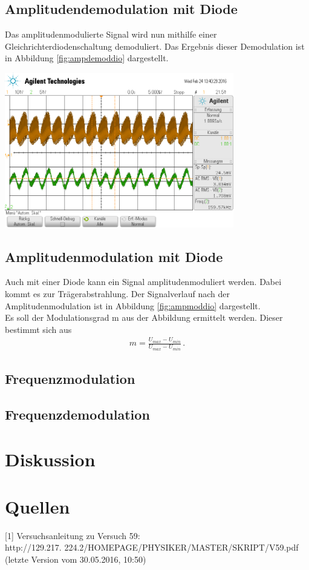 \documentclass[]{scrartcl}
\begin{document}
\subsection{Amplitudendemodulation mit Diode}
Das amplitudenmodulierte Signal wird nun mithilfe einer Gleichrichterdiodenschaltung demoduliert. Das Ergebnis dieser Demodulation ist in Abbildung \ref{fig:ampdemoddio} dargestellt. 
\begin{center}
	\includegraphics[width=10cm]{images/ampdemoddio.png}
	\label{fig:ampdemoddio}
\end{center}
\subsection{Amplitudenmodulation mit Diode}
Auch mit einer Diode kann ein Signal amplitudenmoduliert werden. Dabei kommt es zur Trägerabstrahlung. Der Signalverlauf nach der Amplitudenmodulation ist in Abbildung \ref{fig:ampmoddio} dargestellt. \\
Es soll der Modulationsgrad m aus der Abbildung ermittelt werden. Dieser bestimmt sich aus
\begin{align}
m=\frac{U_{max}-U_{min}}{U_{max}-U_{min}}\,.
\label{eq:modgrad}
\end{align}

\subsection{Frequenzmodulation}

\subsection{Frequenzdemodulation}

\section{Diskussion}

\section{Quellen}
{[1]} Versuchsanleitung zu Versuch 59: \\
http://129.217.
224.2/HOMEPAGE/PHYSIKER/MASTER/SKRIPT/V59.pdf (letzte Version vom 30.05.2016, 10:50)\\
\end{document}
